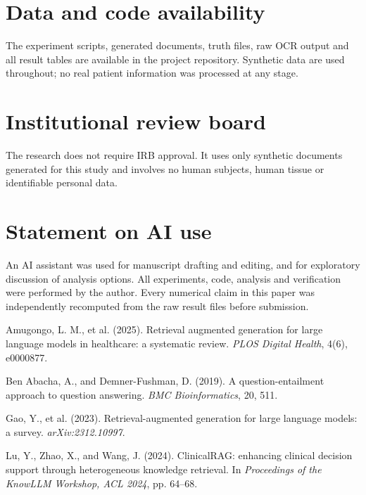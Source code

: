 \documentclass[11pt]{article}
\newif\ifanon
\begin{document}
\section*{Data and code availability}

\ifanon
The experiment scripts, generated documents, truth files, raw OCR output and all result tables
are provided through an anonymised repository link with the submission. Synthetic data are used
throughout; no real patient information was processed at any stage.
\else
The experiment scripts, generated documents, truth files, raw OCR output and all result tables
are available in the project repository. Synthetic data are used throughout; no real patient
information was processed at any stage.
\fi

\section*{Institutional review board}

The research does not require IRB approval. It uses only synthetic documents generated for this
study and involves no human subjects, human tissue or identifiable personal data.

\section*{Statement on AI use}

An AI assistant was used for manuscript drafting and editing, and for exploratory discussion of
analysis options. All experiments, code, analysis and verification were performed by the author.
Every numerical claim in this paper was independently recomputed from the raw result files
before submission.

\begin{thebibliography}{9}
\small

Amugongo, L. M., et al. (2025).
Retrieval augmented generation for large language models in healthcare: a systematic review.
\emph{PLOS Digital Health}, 4(6), e0000877.

Ben Abacha, A., and Demner-Fushman, D. (2019).
A question-entailment approach to question answering.
\emph{BMC Bioinformatics}, 20, 511.

Gao, Y., et al. (2023).
Retrieval-augmented generation for large language models: a survey.
\emph{arXiv:2312.10997}.

Lu, Y., Zhao, X., and Wang, J. (2024).
ClinicalRAG: enhancing clinical decision support through heterogeneous knowledge retrieval.
In \emph{Proceedings of the KnowLLM Workshop, ACL 2024}, pp. 64--68.

\end{thebibliography}
\end{document}
